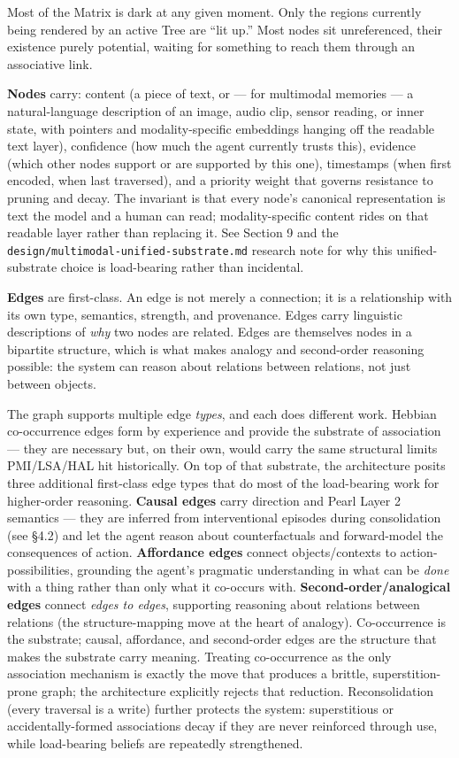 \documentclass[12pt]{article}
\begin{document}
Most of the Matrix is dark at any given moment. Only the regions currently being rendered by an active Tree are ``lit up.'' Most nodes sit unreferenced, their existence purely potential, waiting for something to reach them through an associative link.

\textbf{Nodes} carry: content (a piece of text, or --- for multimodal memories --- a natural-language description of an image, audio clip, sensor reading, or inner state, with pointers and modality-specific embeddings hanging off the readable text layer), confidence (how much the agent currently trusts this), evidence (which other nodes support or are supported by this one), timestamps (when first encoded, when last traversed), and a priority weight that governs resistance to pruning and decay. The invariant is that every node's canonical representation is text the model and a human can read; modality-specific content rides on that readable layer rather than replacing it. See Section 9 and the \texttt{design/multimodal-unified-substrate.md} research note for why this unified-substrate choice is load-bearing rather than incidental.

\textbf{Edges} are first-class. An edge is not merely a connection; it is a relationship with its own type, semantics, strength, and provenance. Edges carry linguistic descriptions of \emph{why} two nodes are related. Edges are themselves nodes in a bipartite structure, which is what makes analogy and second-order reasoning possible: the system can reason about relations between relations, not just between objects.

The graph supports multiple edge \emph{types}, and each does different work. Hebbian co-occurrence edges form by experience and provide the substrate of association --- they are necessary but, on their own, would carry the same structural limits PMI/LSA/HAL hit historically. On top of that substrate, the architecture posits three additional first-class edge types that do most of the load-bearing work for higher-order reasoning. \textbf{Causal edges} carry direction and Pearl Layer 2 semantics --- they are inferred from interventional episodes during consolidation (see §4.2) and let the agent reason about counterfactuals and forward-model the consequences of action. \textbf{Affordance edges} connect objects/contexts to action-possibilities, grounding the agent's pragmatic understanding in what can be \emph{done} with a thing rather than only what it co-occurs with. \textbf{Second-order/analogical edges} connect \emph{edges to edges}, supporting reasoning about relations between relations (the structure-mapping move at the heart of analogy). Co-occurrence is the substrate; causal, affordance, and second-order edges are the structure that makes the substrate carry meaning. Treating co-occurrence as the only association mechanism is exactly the move that produces a brittle, superstition-prone graph; the architecture explicitly rejects that reduction. Reconsolidation (every traversal is a write) further protects the system: superstitious or accidentally-formed associations decay if they are never reinforced through use, while load-bearing beliefs are repeatedly strengthened.
\end{document}
